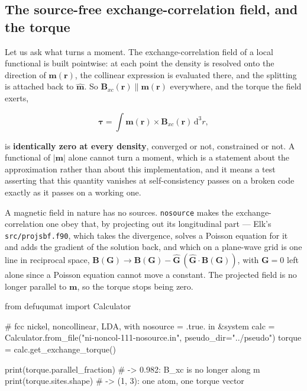 \documentclass[11pt,a4paper]{article}
\newcommand{\code}[1]{\texttt{\small #1}}
\begin{document}
\subsection{The source-free exchange-correlation field, and the torque}

Let us ask what turns a moment. The exchange-correlation field of a local
functional is built pointwise: at each point the density is resolved onto the
direction of $\mathbf m(\mathbf r)$, the collinear expression is evaluated
there, and the splitting is attached back to $\hat{\mathbf m}$. So
$\mathbf B_{xc}(\mathbf r) \parallel \mathbf m(\mathbf r)$ everywhere, and the
torque the field exerts,

\begin{equation*}
\boldsymbol\tau = \int \mathbf m(\mathbf r)\times\mathbf B_{xc}(\mathbf r)\,
\mathrm d^3 r,
\end{equation*}

is \textbf{identically zero at every density}, converged or not, constrained or
not. A functional of $|\mathbf m|$ alone cannot turn a moment, which is a
statement about the approximation rather than about this implementation, and it
means a test asserting that this quantity vanishes at self-consistency passes on
a broken code exactly as it passes on a working one.

A magnetic field in nature has no sources. \code{nosource} makes the
exchange-correlation one obey that, by projecting out its longitudinal part ---
Elk's \code{src/projsbf.f90}, which takes the divergence, solves a Poisson
equation for it and adds the gradient of the solution back, and which on a
plane-wave grid is one line in reciprocal space,
$\mathbf B(\mathbf G) \to \mathbf B(\mathbf G) - \hat{\mathbf G}\,
(\hat{\mathbf G}\cdot\mathbf B(\mathbf G))$, with $\mathbf G = 0$ left alone
since a Poisson equation cannot move a constant. The projected field is no
longer parallel to $\mathbf m$, so the torque stops being zero.

\begin{pycode}
from defuqumat import Calculator

# fcc nickel, noncollinear, LDA, with nosource = .true. in &system
calc = Calculator.from_file("ni-noncol-111-nosource.in", pseudo_dir="../pseudo")
torque = calc.get_exchange_torque()

print(torque.parallel_fraction)   # -> 0.982: B_xc is no longer along m
print(torque.sites.shape)         # -> (1, 3): one atom, one torque vector
\end{pycode}
\end{document}
